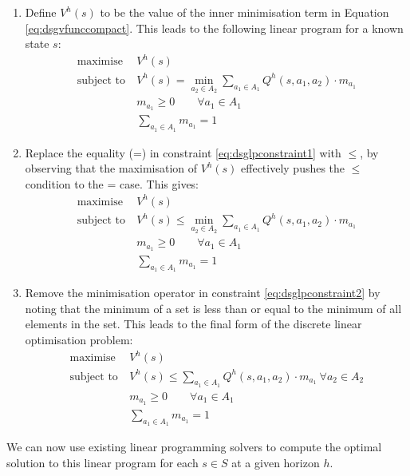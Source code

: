 \begin{enumerate}
  \item Define $V^h(s)$ to be the value of the inner minimisation term in
            Equation \eqref{eq:dsgvfunccompact}. This leads to the following linear program for a known state $s$:
{\small 
\begin{subequations}
\begin{align}
\text{maximise}   &\  V^{h}(s) \nonumber \\
\text{subject to}   &\  V^{h}(s) = \min_{a_2 \in A_2} \sum_{a_1 \in A_1} Q^{h}(s, a_1, a_2) \cdot m_{a_{1}} \label{eq:dsglpconstraint1} \\
                          &\  m_{a_{1}} \geq 0 \qquad \forall a_{1} \in A_1 \nonumber\\
                          &\  \sum_{a_{1} \in A_1} m_{a_{1}} = 1 \nonumber
\end{align}
\end{subequations}
}%

  \item Replace the equality (=) in constraint \eqref{eq:dsglpconstraint1} with
  $\leq$, by observing that the maximisation of $V^{h}(s)$
  effectively pushes the $\leq$ condition to the = case. This gives: 
{\small 
\begin{subequations}
\begin{align}
\text{maximise}   &\  V^{h}(s)\nonumber  \\
\text{subject to}   &\  V^{h}(s) \leq \min_{a_2 \in A_2} \sum_{a_1 \in A_1} Q^{h}(s, a_1, a_2) \cdot m_{a_{1}} \label{eq:dsglpconstraint2} \\
                          &\  m_{a_{1}} \geq 0 \qquad \forall a_{1} \in A_1 \nonumber\\
                          &\  \sum_{a_{1} \in A_1} m_{a_{1}} = 1 \nonumber
\end{align}
\end{subequations}
}%
  
  \item Remove the minimisation operator in constraint \eqref{eq:dsglpconstraint2}
            by noting that the minimum of a set is less than or equal to the minimum of all elements in the set.
            This leads to the final form of the discrete linear optimisation problem:
{\small 
\begin{align*}
\text{maximise}   &\  V^{h}(s) \\
\text{subject to}  &\  V^{h}(s) \leq \sum_{a_1 \in A_1} Q^{h}(s, a_1, a_2) \cdot m_{a_{1}} \ \forall a_2 \in A_2\\
                          &\  m_{a_{1}} \geq 0 \qquad \forall a_{1} \in A_1 \nonumber\\
                          &\  \sum_{a_{1} \in A_1} m_{a_{1}} = 1 \nonumber
\end{align*}
}%

\end{enumerate}

We can now use existing linear programming solvers to compute the optimal
solution to this linear program for each $s \in S$ at a given horizon $h$.

